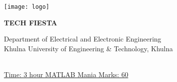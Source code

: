 \documentclass[12pt,paper=a4,answers]{exam}
\begin{document}

\noindent
\begin{minipage}[l]{.1\textwidth}%
\noindent
\texttt{[image: logo]}
\end{minipage}
\hfill
\begin{minipage}[r]{.75\textwidth}%
\begin{center}
{\large \textbf{ TECH FIESTA} \par
\large Department of Electrical and Electronic Engineering \\[2pt]
\large {Khulna University of Engineering \& Technology, Khulna} \\[2pt]
 \par}
  \vspace{0.5cm}
\end{center}
\end{minipage}
\par
\noindent
\\
\uline{Time: 3 hour   \hfill MATLAB Mania \hfill        Marks: 60}
\end{document}
